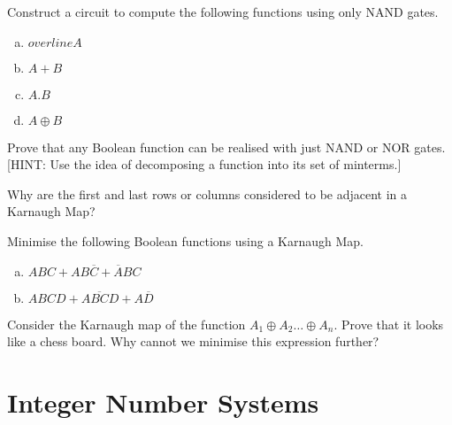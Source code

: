 \begin{ExerciseList}
\Exercise 
Construct a circuit to compute the following functions using only NAND gates.
\begin{enumerate}[a)]
\item $overline{A}$
\item $A+B$
\item $A.B$
\item $A \oplus B$
\end{enumerate}

\Exercise[difficulty=2]
Prove that any Boolean function can be realised with just NAND or NOR gates.
[HINT: Use the idea of decomposing a function into its set of minterms.]

\Exercise 
Why are the first and last rows or columns considered to be adjacent in a Karnaugh Map?

\Exercise
Minimise the following Boolean functions using a Karnaugh Map.
\begin{enumerate}[a)]
\item $ABC + AB\overline{C} + \overline{A}BC$
\item $ABCD + A\overline{BC}D + A\overline{D}$
\end{enumerate}

\Exercise[difficulty = 1]
Consider the Karnaugh map of the function $A_1 \oplus A_2 \ldots \oplus A_n$. Prove that
it looks like a chess board. Why cannot we minimise this expression further?

\end{ExerciseList}


\section*{Integer Number Systems}

